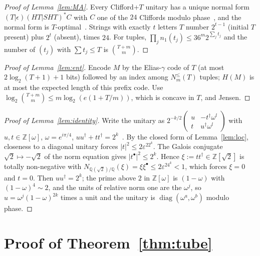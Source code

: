 \documentclass[aps,prx,twocolumn,superscriptaddress,nofootinbib,longbibliography]{revtex4-2}
\theoremstyle{plain}
\theoremstyle{definition}
\theoremstyle{remark}
\newcommand{\Z}{\mathbb{Z}}
\newcommand{\Q}{\mathbb{Q}}
\begin{document}
\begin{proof}[Proof of Lemma~\ref{lem:MA}]
Every Clifford+$T$ unitary has a unique normal form $(T|\epsilon)(HT|SHT)^*C$ with $C$ one of the $24$ Cliffords modulo phase~\cite{MA08}, and the normal form is $T$-optimal~\cite{KMM13}. Strings with exactly $t$ letters $T$ number $2^{t-1}$ (initial $T$ present) plus $2^t$ (absent), times $24$. For tuples, $\prod_jn_1(t_j)\le36^m2^{\sum_jt_j}$ and the number of $(t_j)$ with $\sum t_j\le T$ is $\binom{T+m}{m}$.
\end{proof}

\begin{proof}[Proof of Lemma~\ref{lem:ent}]
Encode $M$ by the Elias-$\gamma$ code of $T$ (at most $2\log_2(T+1)+1$ bits) followed by an index among $N^{\le}_m(T)$ tuples; $H(M)$ is at most the expected length of this prefix code. Use $\log_2\binom{T+m}{m}\le m\log_2(e(1+T/m))$, which is concave in $T$, and Jensen.
\end{proof}

\begin{proof}[Proof of Lemma~\ref{lem:identity}]
Write the unitary as $2^{-k/2}\begin{pmatrix}u&-t^\dagger\omega^l\\ t&u^\dagger\omega^l\end{pmatrix}$ with $u,t\in\Z[\omega]$, $\omega=e^{i\pi/4}$, $uu^\dagger+tt^\dagger=2^k$~\cite{KMM13}. By the closed form of Lemma~\ref{lem:loc}, closeness to a diagonal unitary forces $|t|^2\le2\varepsilon^22^k$. The Galois conjugate $\sqrt2\mapsto-\sqrt2$ of the norm equation gives $|t^\bullet|^2\le2^k$. Hence $\xi:=tt^\dagger\in\Z[\sqrt2]$ is totally non-negative with $N_{\Q(\sqrt2)/\Q}(\xi)=\xi\xi^\bullet\le2\varepsilon^24^k<1$, which forces $\xi=0$ and $t=0$. Then $uu^\dagger=2^k$; the prime above $2$ in $\Z[\omega]$ is $(1-\omega)$ with $(1-\omega)^4\sim2$, and the units of relative norm one are the $\omega^j$, so $u=\omega^j(1-\omega)^{2k}$ times a unit and the unitary is $\operatorname{diag}(\omega^a,\omega^b)$ modulo phase.
\end{proof}

\section{Proof of Theorem~\ref{thm:tube}}\label{app:tube}
\end{document}
